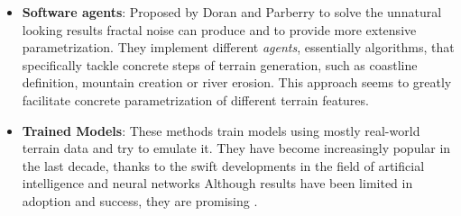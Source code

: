 \begin{itemize}
\begin{itemize}
        \item \textbf{Procedural Hydrology}:
        Focused on the formation of the river network and drainage basins, these methods simulate water flow and sediment transport across elevation maps \cite{Tzathas:2024:PAE}. 
        Incorporating flow routing improves realism in large-scale terrain structures.
        
        \item \textbf{Plate Tectonics and Thermal Uplift}:
        Macro-scale geological formation can be emulated using plate motion and crust deformation models \cite{Cordonnier:2016:LST}.
        These are computationally demanding but generate globally coherent terrain features.
    \end{itemize}
    \item \textbf{Software agents}: Proposed by Doran and Parberry \cite{Doran:2010:CPT} to solve the unnatural looking results fractal noise can produce and to provide more extensive parametrization.
    They implement different \textit{agents}, essentially algorithms, that specifically tackle concrete steps of terrain generation, such as coastline definition, mountain creation or river erosion. 
    This approach seems to greatly facilitate concrete parametrization of different terrain features.
    \item \textbf{Trained Models}:
    These methods train models using mostly real-world terrain data and try to emulate it.
    They have become increasingly popular in the last decade, thanks to the swift developments in the field of artificial intelligence and neural networks
    Although results have been limited in adoption and success, they are promising \cite{Maleki:2024:PCG}.
\end{itemize}

